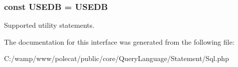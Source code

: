 \subsubsection[{U\+S\+E\+D\+B}]{\setlength{\rightskip}{0pt plus 5cm}const U\+S\+E\+D\+B = \textquotesingle{}U\+S\+E\+D\+B\textquotesingle{}}\label{interface_able_polecat___query_language___statement___sql___interface_a21b349e017407dd48cf65bddb39a4766}
Supported utility statements. 

The documentation for this interface was generated from the following file\+:\begin{DoxyCompactItemize}
\item 
C\+:/wamp/www/polecat/public/core/\+Query\+Language/\+Statement/Sql.\+php\end{DoxyCompactItemize}
